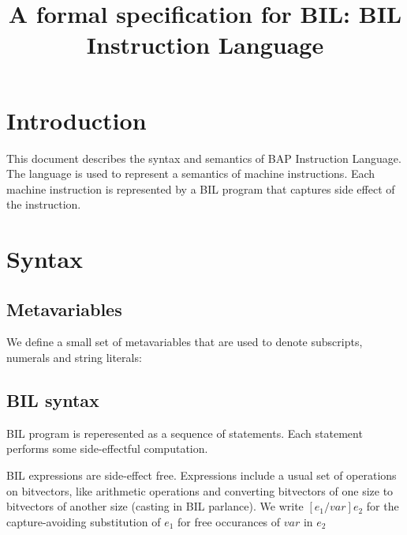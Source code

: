 \documentclass[11pt]{article}
\begin{document}


\title{A formal specification for BIL: BIL Instruction Language}
\maketitle

\tableofcontents
\clearpage

\section{Introduction}
\label{sec:intro}

This document describes the syntax and semantics of BAP Instruction
Language.  The language is used to represent a semantics of machine
instructions. Each machine instruction is represented by a BIL program
that captures side effect of the instruction.

\section{Syntax}
\label{sec:syntax}

\subsection{Metavariables}
\label{sec:meta}

We define a small set of metavariables that are used to denote
subscripts, numerals and string literals:

\ottmetavars

\subsection{BIL syntax}

BIL program is reperesented as a sequence of statements. Each
statement performs some side-effectful computation.

\ottgrammartabular{
\ottbil\ottinterrule
}

\ottgrammartabular{
\ottstmt\ottinterrule
}

BIL expressions are side-effect free. Expressions include a usual set
of operations on bitvectors, like arithmetic operations and converting
bitvectors of one size to bitvectors of another size (casting in BIL
parlance).  We write $[e_1/var]e_2$ for the capture-avoiding
substitution of $e_1$ for free occurances of $var$ in $e_2$

\ottgrammartabular{
\ottexp\ottinterrule
}
\end{document}
